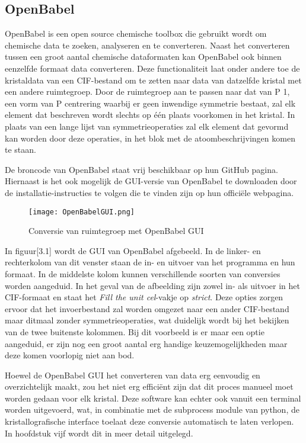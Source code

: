\subsection{OpenBabel}
OpenBabel is een open source chemische toolbox die gebruikt wordt om chemische data te zoeken, analyseren en te converteren.\citep*{OBAB1} Naast het converteren tussen een groot aantal chemische dataformaten kan OpenBabel ook binnen eenzelfde formaat data converteren. Deze functionaliteit laat onder andere toe de kristaldata van een CIF-bestand om te zetten naar data van datzelfde kristal met een andere ruimtegroep. Door de ruimtegroep aan te passen naar dat van P 1, een vorm van P centrering waarbij er geen inwendige symmetrie bestaat, zal elk element dat beschreven wordt slechts op één plaats voorkomen in het kristal. In plaats van een lange lijst van symmetrieoperaties zal elk element dat gevormd kan worden door deze operaties, in het blok met de atoombeschrijvingen komen te staan.   
\par
De broncode van OpenBabel staat vrij beschikbaar op hun GitHub pagina.  Hiernaast is het ook mogelijk de GUI-versie van OpenBabel te downloaden door de installatie-instructies te volgen die te vinden zijn op hun officiële webpagina.\citep*{OBAB1}   
\par
\begin{figure}[h]
\begin{center}
\texttt{[image: OpenBabelGUI.png]}
\end{center}
\caption{Conversie van ruimtegroep met OpenBabel GUI}
\end{figure}
\par
In figuur[3.1] wordt de GUI van OpenBabel afgebeeld. In de linker- en rechterkolom van dit venster staan de in- en uitvoer van het programma en hun formaat. In de middelste kolom kunnen verschillende soorten van conversies worden aangeduid. In het geval van de afbeelding zijn zowel in- als uitvoer in het CIF-formaat en staat het \textit{Fill the unit cel}-vakje op \textit{strict}. Deze opties zorgen ervoor dat het invoerbestand zal worden omgezet naar een ander CIF-bestand maar ditmaal zonder symmetrieoperaties, wat duidelijk wordt bij het bekijken van de twee buitenste kolommen. Bij dit voorbeeld is er maar een optie aangeduid, er zijn nog een groot aantal erg handige keuzemogelijkheden maar deze komen voorlopig niet aan bod.
\par
Hoewel de OpenBabel GUI het converteren van data erg eenvoudig en overzichtelijk maakt, zou het niet erg efficiënt zijn dat dit proces manueel moet worden gedaan voor elk kristal. Deze software kan echter ook vanuit een terminal worden uitgevoerd, wat, in combinatie met de subprocess module van python, de kristallografische interface toelaat deze conversie automatisch te laten verlopen. In hoofdstuk vijf wordt dit in meer detail uitgelegd.
\par     

